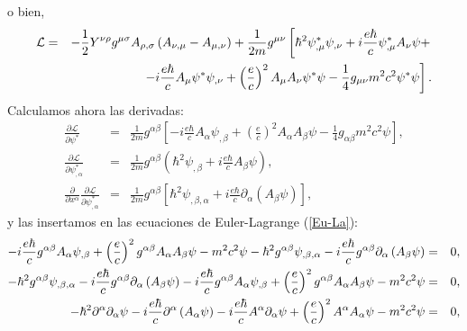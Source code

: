o bien, 
\begin{eqnarray}
\mathcal{L} &=&-\frac{1}{2}Y^{\nu \rho }g^{\mu \sigma }A_{\rho ,\sigma
}\left( A_{\nu ,\mu }-A_{\mu ,\nu }\right) +\frac{1}{2m}g^{\mu \nu }\left[
\hbar ^{2}\psi _{,\mu }^{\ast }\psi _{,\nu }+i\frac{e\hbar }{c}\psi
_{,\mu }^{\ast }A_{\nu }\psi +\right. \notag \\
&&\left. -i\frac{e\hbar }{c}A_{\mu }\psi ^{\ast }\psi _{,\nu }+\left( 
\frac{e}{c}\right) ^{2}A_{\mu }A_{\nu }\psi ^{\ast }\psi -\frac{1}{4}g_{\mu
\nu }m^{2}c^{2}\psi ^{\ast }\psi \right] . \label{LagKGM2}
\end{eqnarray}
Calculamos ahora las derivadas: 
\begin{eqnarray*}
\frac{\partial \mathcal{L}}{\partial \psi ^{\ast }} &=&\frac{1}{2m}g^{\alpha
\beta }\left[ -i\frac{e\hbar }{c}A_{\alpha }\psi _{,\beta }+\left( \frac{e%
}{c}\right) ^{2}A_{\alpha }A_{\beta }\psi -\frac{1}{4}g_{\alpha \beta
}m^{2}c^{2}\psi \right] , \\
\frac{\partial \mathcal{L}}{\partial \psi _{,\alpha }^{\ast }} &=&\frac{1}{2m%
}g^{\alpha \beta }\left( \hbar ^{2}\psi _{,\beta }+i\frac{e\hbar }{c}%
A_{\beta }\psi \right) , \\
\frac{\partial }{\partial x^{\alpha }}\frac{\partial \mathcal{L}}{\partial
\psi _{,\alpha }^{\ast }} &=&\frac{1}{2m}g^{\alpha \beta }\left[ \hbar
^{2}\psi _{,\beta ,\alpha }+i\frac{e\hbar }{c}\partial _{\alpha }\left(
A_{\beta }\psi \right) \right] ,
\end{eqnarray*}
y las insertamos en las ecuaciones de Euler-Lagrange (\ref{Eu-La}): 
\begin{eqnarray*}
-i\frac{e\hbar }{c}g^{\alpha \beta }A_{\alpha }\psi _{,\beta }+\left( 
\frac{e}{c}\right) ^{2}g^{\alpha \beta }A_{\alpha }A_{\beta }\psi
-m^{2}c^{2}\psi -\hbar ^{2}g^{\alpha \beta }\psi _{,\beta ,\alpha }-i\frac{%
e\hbar }{c}g^{\alpha \beta }\partial _{\alpha }\left( A_{\beta }\psi
\right) &=&0, \\
-\hbar ^{2}g^{\alpha \beta }\psi _{,\beta ,\alpha }-i\frac{e\hbar }{c}%
g^{\alpha \beta }\partial _{\alpha }\left( A_{\beta }\psi \right) -i\frac{%
e\hbar }{c}g^{\alpha \beta }A_{\alpha }\psi _{,\beta }+\left( \frac{e}{c}%
\right) ^{2}g^{\alpha \beta }A_{\alpha }A_{\beta }\psi -m^{2}c^{2}\psi &=&0,
\\
-\hbar ^{2}\partial ^{\alpha }\partial _{\alpha }\psi -i\frac{e\hbar }{c}%
\partial ^{\alpha }\left( A_{\alpha }\psi \right) -i\frac{e\hbar }{c}%
A^{\alpha }\partial _{\alpha }\psi +\left( \frac{e}{c}\right) ^{2}A^{\alpha
}A_{\alpha }\psi -m^{2}c^{2}\psi &=&0,
\end{eqnarray*}
